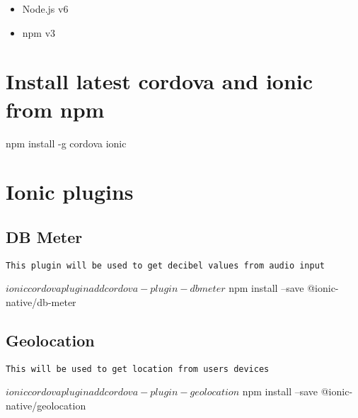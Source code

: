 \documentclass[]{article}
\newenvironment{Shaded}{}{}
\newcommand{\ExtensionTok}[1]{#1}
\newcommand{\NormalTok}[1]{#1}
\providecommand{\tightlist}{%
  \setlength{\itemsep}{0pt}\setlength{\parskip}{0pt}}
\begin{document}
\begin{itemize}
\tightlist
\item
  Node.js v6
\item
  npm v3
\end{itemize}

\section{Install latest cordova and ionic from
npm}\label{install-latest-cordova-and-ionic-from-npm}

\begin{Shaded}
\begin{Highlighting}[]
\ExtensionTok{npm}\NormalTok{ install -g cordova ionic}
\end{Highlighting}
\end{Shaded}

\section{Ionic plugins}\label{ionic-plugins}

\subsection{DB Meter}\label{db-meter}

\begin{verbatim}
This plugin will be used to get decibel values from audio input
\end{verbatim}

\begin{Shaded}
\begin{Highlighting}[]
\NormalTok{$ }\ExtensionTok{ionic}\NormalTok{ cordova plugin add cordova-plugin-dbmeter}
\NormalTok{$ }\ExtensionTok{npm}\NormalTok{ install --save @ionic-native/db-meter}
\end{Highlighting}
\end{Shaded}

\subsection{Geolocation}\label{geolocation}

\begin{verbatim}
This will be used to get location from users devices
\end{verbatim}

\begin{Shaded}
\begin{Highlighting}[]
\NormalTok{$ }\ExtensionTok{ionic}\NormalTok{ cordova plugin add cordova-plugin-geolocation}
\NormalTok{$ }\ExtensionTok{npm}\NormalTok{ install --save @ionic-native/geolocation}
\end{Highlighting}
\end{Shaded}
\end{document}

